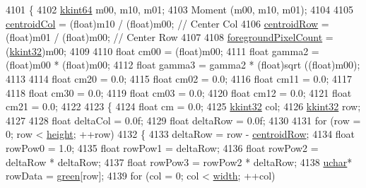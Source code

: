 \begin{DoxyCode}
4101 \{
4102   \hyperlink{namespace_k_k_b_aa3486b1c5ea9162b3b020c69f72826eb}{kkint64}  m00, m10, m01;
4103   Moment (m00, m10, m01);
4104 
4105   \hyperlink{class_k_k_b_1_1_raster_ac4cb3984d20f6eef6fd4f201681ea1d5}{centroidCol} = (float)m10 / (\textcolor{keywordtype}{float})m00;   \textcolor{comment}{// Center Col}
4106   \hyperlink{class_k_k_b_1_1_raster_a3380e5734ec57a147e36c734cc83c5ff}{centroidRow} = (float)m01 / (\textcolor{keywordtype}{float})m00;   \textcolor{comment}{// Center Row}
4107 
4108   \hyperlink{class_k_k_b_1_1_raster_aa7e86253f4b9c347da718732e44b60e8}{foregroundPixelCount} = (\hyperlink{namespace_k_k_b_a8fa4952cc84fda1de4bec1fbdd8d5b1b}{kkint32})m00;
4109 
4110   \textcolor{keywordtype}{float}  cm00   = (float)m00;
4111   \textcolor{keywordtype}{float}  gamma2 = (float)m00 * (\textcolor{keywordtype}{float})m00;
4112   \textcolor{keywordtype}{float}  gamma3 = gamma2 * (float)sqrt ((\textcolor{keywordtype}{float})m00);
4113         
4114   \textcolor{keywordtype}{float}  cm20 = 0.0;
4115   \textcolor{keywordtype}{float}  cm02 = 0.0;
4116   \textcolor{keywordtype}{float}  cm11 = 0.0;
4117 
4118   \textcolor{keywordtype}{float}  cm30 = 0.0;
4119   \textcolor{keywordtype}{float}  cm03 = 0.0;
4120   \textcolor{keywordtype}{float}  cm12 = 0.0;
4121   \textcolor{keywordtype}{float}  cm21 = 0.0;
4122 
4123   \{
4124     \textcolor{keywordtype}{float}   cm = 0.0;
4125     \hyperlink{namespace_k_k_b_a8fa4952cc84fda1de4bec1fbdd8d5b1b}{kkint32} col;
4126     \hyperlink{namespace_k_k_b_a8fa4952cc84fda1de4bec1fbdd8d5b1b}{kkint32} row;
4127 
4128     \textcolor{keywordtype}{float}   deltaCol = 0.0f;
4129     \textcolor{keywordtype}{float}   deltaRow = 0.0f;
4130 
4131     \textcolor{keywordflow}{for}  (row = 0;  row < \hyperlink{class_k_k_b_1_1_raster_af39ff189de4fbb6de98392e187efafb7}{height};  ++row)
4132     \{
4133       deltaRow = row - \hyperlink{class_k_k_b_1_1_raster_a3380e5734ec57a147e36c734cc83c5ff}{centroidRow};
4134       \textcolor{keywordtype}{float}  rowPow0 = 1.0;
4135       \textcolor{keywordtype}{float}  rowPow1 = deltaRow;
4136       \textcolor{keywordtype}{float}  rowPow2 = deltaRow * deltaRow;
4137       \textcolor{keywordtype}{float}  rowPow3 = rowPow2  * deltaRow;
4138       \hyperlink{namespace_k_k_b_ace9969169bf514f9ee6185186949cdf7}{uchar}*  rowData = \hyperlink{class_k_k_b_1_1_raster_a2d2238911145488e226cd2e34fc8448c}{green}[row];
4139       \textcolor{keywordflow}{for}  (col = 0;  col < \hyperlink{class_k_k_b_1_1_raster_ae0bcc103e191c3421d7692dc69ceb554}{width};  ++col)

\end{DoxyCode}
